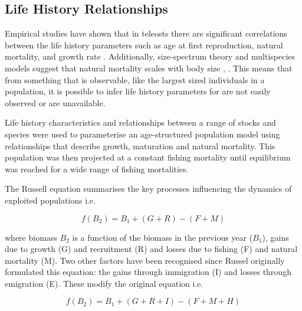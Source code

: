 \documentclass{pnastwo}
\begin{document}
\begin{article}
\begin{materials}



\subsection{Life History Relationships}


Empirical studies have shown that in teleosts there are significant correlations between
the life history parameters such as age at first reproduction, natural mortality, 
and growth rate \cite{roff1984evolution}. Additionally, size-spectrum theory 
and multispecies models suggest that natural mortality scales with body size 
\cite{andersen2006asymptotic}, \cite{pope2006modelling} \cite{gislason2008coexistence}. 
This means that from something that is observable, like the largest sized individuals in 
a population, it is possible to infer life history parameters for are not easily 
observed or are unavailable.

Life history characteristics and relationships between a range of stocks and species 
\cite{gislason2008coexistence} were used to parameterise an age-structured population 
model using relationships that describe growth, maturation and natural mortality.
This population was then projected at a constant fishing mortality until equilibrium 
was reached for a wide range of fishing mortalities.

The Russell equation \cite{russell1931some} summarises the key processes influencing the dynamics 
of exploited populations i.e.
 
\begin{equation}f(B_2) = B_1 + (G + R) - (F+M)\end{equation}

where biomass $B_2$ is a function of the biomass in the previous year ($B_1$), gains due to growth 
(G) and recruitment (R) and losses due to fishing (F) and natural mortality (M). Two other 
factors have been recognised since Russel originally formulated this equation: the gains through 
immigration (I) and losses through emigration (E). These modify the original equation i.e.

\begin{equation}f(B_2) = B_1 + (G+R+I) - (F+M+H)\end{equation}


\end{materials}
\end{article}
\end{document}
